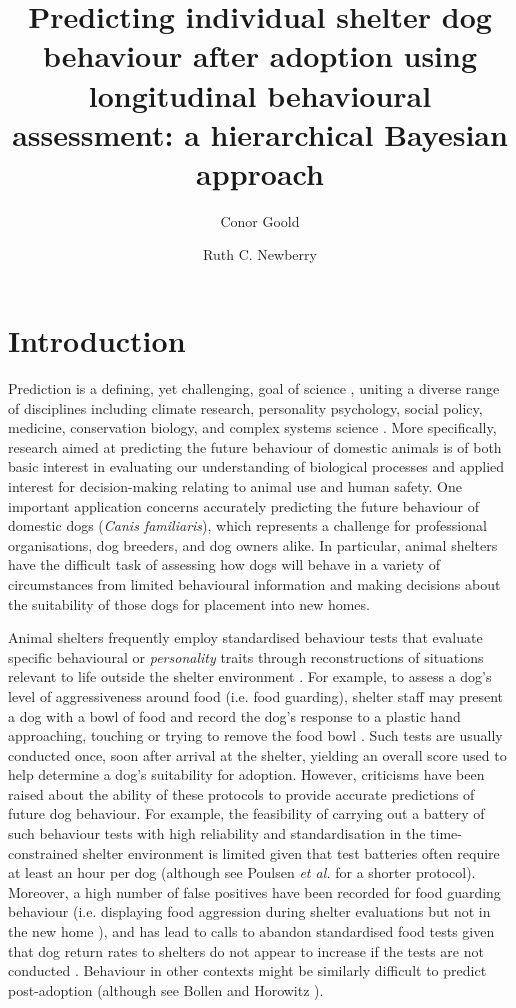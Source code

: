 \documentclass[fleqn,10pt]{wlscirep}
\title{Predicting individual shelter dog behaviour after adoption using longitudinal behavioural assessment: a hierarchical Bayesian approach}
\author[1]{Conor Goold}
\author[2*]{Ruth C. Newberry}
\affil[1]{School of Biology, Faculty of Biological Sciences, University of Leeds, Leeds, LS2 9JT, UK}
\affil[2]{Department of Animal and Aquacultural Sciences, Faculty of Biosciences, Norwegian University of Life Sciences, Aas, 1400, Norway}
\affil[*]{ruth.newberry@nmbu.no}
\begin{document}
\flushbottom
\maketitle
\thispagestyle{empty}

\section*{Introduction}
Prediction is a defining, yet challenging, goal of science \cite{hofstadter1951}, uniting a diverse range of disciplines including climate research, personality psychology, social policy, medicine, conservation biology, and complex systems science \cite{sarewitz1999}. More specifically, research aimed at predicting the future behaviour of domestic animals is of both basic interest in evaluating our understanding of biological processes and applied interest for decision-making relating to animal use and human safety. One important application concerns accurately predicting the future behaviour of domestic dogs (\textit{Canis familiaris}), which represents a challenge for professional organisations, dog breeders, and dog owners alike. In particular, animal shelters have the difficult task of assessing how dogs will behave in a variety of circumstances from limited behavioural information and making decisions about the suitability of those dogs for placement into new homes.

Animal shelters frequently employ standardised behaviour tests that evaluate specific behavioural or \textit{personality} traits through reconstructions of situations relevant to life outside the shelter environment \cite{vanderborg1991,marston2003,mornement2010,taylor2006,rayment2015,clay2020behaviour}. For example, to assess a dog's level of aggressiveness around food (i.e. food guarding), shelter staff may present a dog with a bowl of food and record the dog's response to a plastic hand approaching, touching or trying to remove the food bowl \cite{mohangibbons2012,mohangibbons2018,marder2013}. Such tests are usually conducted once, soon after arrival at the shelter, yielding an overall score used to help determine a dog's suitability for adoption. However, criticisms have been raised about the ability of these protocols to provide accurate predictions of future dog behaviour. For example, the feasibility of carrying out a battery of such behaviour tests with high reliability and standardisation in the time-constrained shelter environment is limited given that test batteries often require at least an hour per dog \cite{vanderborg1991,mornement2009} (although see Poulsen \textit{et al.} \cite{poulsen2010} for a shorter protocol). Moreover, a high number of false positives have been recorded for food guarding behaviour (i.e. displaying food aggression during shelter evaluations but not in the new home \cite{mohangibbons2012,marder2013}), and has lead to calls to abandon standardised food tests given that dog return rates to shelters do not appear to increase if the tests are not conducted \cite{mohangibbons2018}. Behaviour in other contexts might be similarly difficult to predict post-adoption \cite{christensen2007,mornement2015} (although see Bollen and Horowitz \cite{bollen2008}).
\end{document}
